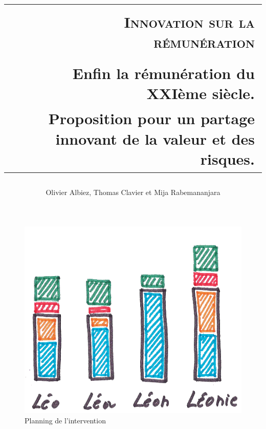 \documentclass[12pt]{article}
\title{
  \begin{tabular}{p{2 cm} r}
    \hline\hline
    & \\
    & \textsc{Innovation sur la rémunération} \\
    & \\
    & \small{Enfin la rémunération du XXIème siècle.}\\
    & \small{Proposition pour un partage innovant de la valeur et des risques.} \\
    \hline\hline
  \end{tabular}
}
\date{}
\author{Olivier Albiez, Thomas Clavier et Mija Rabemananjara}
\begin{document}
\pagestyle{plain}
\maketitle
\newpage

\tableofcontents
\newpage

\begin{figure}
  \begin{center}
    \includegraphics[width=\textwidth]{includes/remuneration}
  \end{center}
  \caption{Planning de l'intervention}
  \label{planning}
\end{figure}


\end{document}
